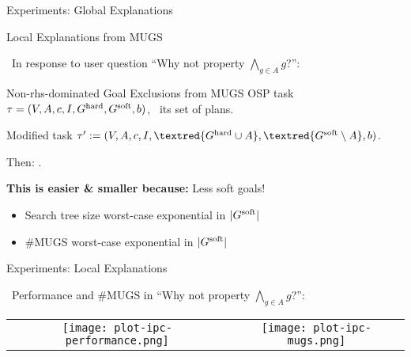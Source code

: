 \begin{frame}{Experiments: Global Explanations}

\centering

\setlength{\tabcolsep}{2pt}
\renewcommand{\arraystretch}{0.8}

\tiny

 

\end{frame}


\begin{frame}{Local Explanations from MUGS}

\notesym~In response to user question ``Why not property $\bigwedge_{g \in A} g$?'':

\begin{myprop}{Non-rhs-dominated Goal Exclusions from MUGS}
%
OSP task $\tau =
(V,\allowbreak A,\allowbreak{\ensuremath{c}},\allowbreak I,\allowbreak G^{\text{\textup{hard}}},\allowbreak G^{\text{\textup{soft}}},\allowbreak{\ensuremath{b}})$, \plans\
its set of plans.

Modified task $\task' :=
(\vars,\allowbreak\acts,\allowbreak\cost,\allowbreak\init,\allowbreak\textred{\goalhard
\cup A},\allowbreak\textred{\goalsoft \setminus
A},\allowbreak\costbound)$.

Then: .
%
\end{myprop}

\bigskip \smallskip \pause

%
\textbf{This is easier \& smaller because:} \pause Less soft goals!

\begin{itemize}
\item Search tree size worst-case exponential in $|G^{\text{\textup{soft}}}|$
\item \#MUGS worst-case exponential in $|G^{\text{\textup{soft}}}|$
\end{itemize}

\medskip

\end{frame}


\begin{frame}{Experiments: Local Explanations}

\notesym~Performance and \#MUGS 
in ``Why not property $\bigwedge_{g \in A} g$?'':

\medskip

\small

\centering

\begin{tabular}{cc}
\begin{minipage}{0.45\textwidth}
\texttt{[image: plot-ipc-performance.png]}
\end{minipage} &
\hspace{0.5cm} \begin{minipage}{0.45\textwidth}
\texttt{[image: plot-ipc-mugs.png]}
\end{minipage}
\end{tabular}

\end{frame}



